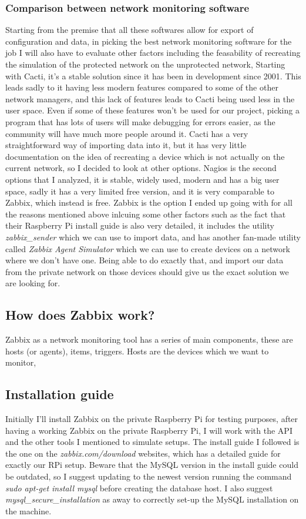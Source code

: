 \documentclass[a4paper, 12pt]{book}
\begin{document}
\subsubsection{Comparison between network monitoring software}
Starting from the premise that all these softwares allow for export of configuration and data, in picking the best network monitoring software for the job I will also have to evaluate other factors including the feasability of recreating the simulation of the protected network on the unprotected network,
Starting with Cacti, it's a stable solution since it has been in development since 2001. This leads sadly to it having less modern features compared to some of the other network managers, and this lack of features leads to Cacti being used less in the user space. Even if some of these features won't be used for our project, picking a program that has lots of users will make debugging for errors easier, as the community will have much more people around it. Cacti has a very straightforward way of importing data into it, but it has very little documentation on the idea of recreating a device which is not actually on the current network, so I decided to look at other options.
Nagios is the second options that I analyzed, it is stable, widely used, modern and has a big user space, sadly it has a very limited free version, and it is very comparable to Zabbix, which instead is free. Zabbix is the option I ended up going with for all the reasons mentioned above inlcuing some other factors such as the fact that their Raspberry Pi install guide is also very detailed, it includes the utility \textit{zabbix\_sender} which we can use to import data, and has another fan-made utility called \textit{Zabbix Agent Simulator} which we can use to create devices on a network where we don't have one. Being able to do exactly that, and import our data from the private network on those devices should give us the exact solution we are looking for.

\subsection{How does Zabbix work?}
Zabbix as a network monitoring tool has a series of main components, these are hosts (or agents), items, triggers.
Hosts are the devices which we want to monitor,

\subsection{Installation guide}
Initially I'll install Zabbix on the private Raspberry Pi for testing purposes, after having a working Zabbix on the private Raspberry Pi, I will work with the API and the other tools I mentioned to simulate setups. The install guide I followed is the one on the \textit{zabbix.com/download} websites, which has a detailed guide for exactly our RPi setup. Beware that the MySQL version in the install guide could be outdated, so I suggest updating to the newest version running the command \textit{sudo apt-get install mysql} before creating the database host. I also suggest \textit{mysql\_secure\_installation} as away to correctly set-up the MySQL installation on the machine.
\end{document}
